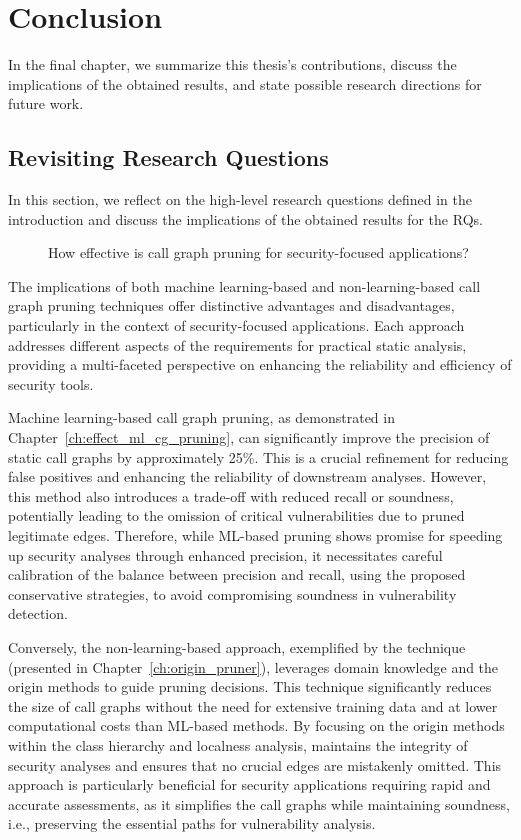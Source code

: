\chapter{Conclusion}
\label{conclusion}
In the final chapter, we summarize this thesis's contributions, discuss the implications of the obtained results, and state possible research directions for future work.

\section{Revisiting Research Questions}
In this section, we reflect on the high-level research questions defined in the introduction and discuss the implications of the obtained results for the RQs.

\begin{description}
    \item[] How effective is call graph pruning for security-focused applications?
\end{description}

The implications of both machine learning-based and non-learning-based call graph pruning techniques offer distinctive advantages and disadvantages, particularly in the context of security-focused applications. Each approach addresses different aspects of the requirements for practical static analysis, providing a multi-faceted perspective on enhancing the reliability and efficiency of security tools.

Machine learning-based call graph pruning, as demonstrated in Chapter~\ref{ch:effect_ml_cg_pruning}, can significantly improve the precision of static call graphs by approximately 25\%. This is a crucial refinement for reducing false positives and enhancing the reliability of downstream analyses. However, this method also introduces a trade-off with reduced recall or soundness, potentially leading to the omission of critical vulnerabilities due to pruned legitimate edges. Therefore, while ML-based pruning shows promise for speeding up security analyses through enhanced precision, it necessitates careful calibration of the balance between precision and recall, using the proposed conservative strategies, to avoid compromising soundness in vulnerability detection.

Conversely, the non-learning-based approach, exemplified by the  technique (presented in Chapter~\ref{ch:origin_pruner}), leverages domain knowledge and the origin methods to guide pruning decisions. This technique significantly reduces the size of call graphs without the need for extensive training data and at lower computational costs than ML-based methods. By focusing on the origin methods within the class hierarchy and localness analysis,  maintains the integrity of security analyses and ensures that no crucial edges are mistakenly omitted. This approach is particularly beneficial for security applications requiring rapid and accurate assessments, as it simplifies the call graphs while maintaining soundness, i.e., preserving the essential paths for vulnerability analysis.

